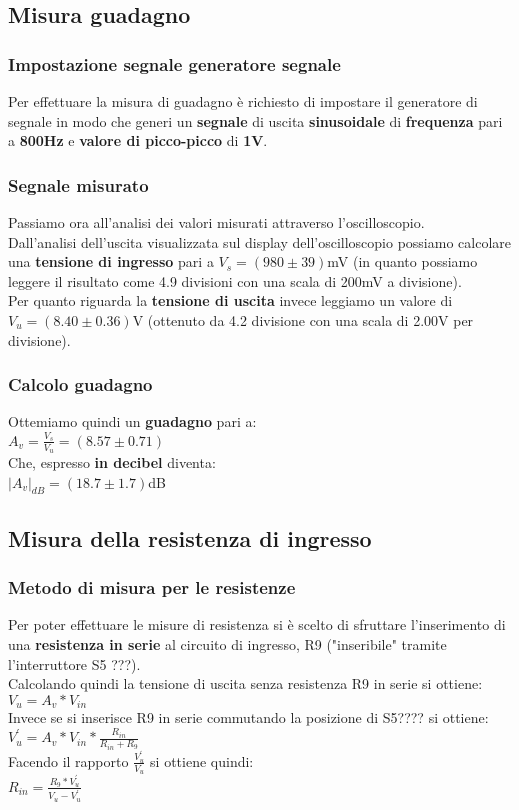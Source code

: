 \documentclass{article}
\begin{document}
\subsection{Misura guadagno}
\subsubsection{Impostazione segnale generatore segnale}
Per effettuare la misura di guadagno è richiesto di impostare il generatore di segnale in modo che generi un \textbf{segnale} di uscita \textbf{sinusoidale} di \textbf{frequenza} pari a \textbf{800Hz} e \textbf{valore di picco-picco} di \textbf{1V}.

\subsubsection{Segnale misurato}
Passiamo ora all'analisi dei valori misurati attraverso l'oscilloscopio.\\Dall'analisi dell'uscita visualizzata sul display dell'oscilloscopio possiamo calcolare una \textbf{tensione di ingresso} pari a \large $V_s = (980 \pm 39)$mV \normalsize (in quanto possiamo leggere il risultato come 4.9 divisioni con una scala di 200mV a divisione).\\
Per quanto riguarda la \textbf{tensione di uscita} invece leggiamo un valore di \large $V_u = (8.40 \pm 0.36)$V \normalsize (ottenuto da 4.2 divisione con una scala di 2.00V per divisione).
\subsubsection{Calcolo guadagno}
Ottemiamo quindi un \textbf{guadagno} pari a:\\ \large $A_v = \frac{V_s}{V_u} = (8.57 \pm 0.71)$ \normalsize \\Che, espresso \textbf{in decibel} diventa:\\ \large $ |A_v|_{dB} = (18.7 \pm 1.7)$dB \normalsize

\subsection{Misura della resistenza di ingresso}
\subsubsection{Metodo di misura per le resistenze}
Per poter effettuare le misure di resistenza si è scelto di sfruttare l'inserimento di una \textbf{resistenza in serie} al circuito di ingresso, R9 ("inseribile" tramite l'interruttore S5 ???).\\Calcolando quindi la tensione di uscita senza resistenza R9 in serie si ottiene:\\
\large $V_{u} = A_{v} * V_{in}$ \normalsize \\ Invece se si inserisce R9 in serie commutando la posizione di S5???? si ottiene:\\
\large $ V_{u}^{'} = A_{v} * V_{in} * \frac{R_{in}}{R_{in} + R_9} $ \normalsize \\ Facendo il rapporto \large $\frac{V_{u}^{'}}{{V_u}}$ \normalsize si ottiene quindi: \\ \large $R_{in} = \frac{R_9 * V_{u}^{'}}{V_u - V_{u}^{'}} $ \normalsize
\end{document}
